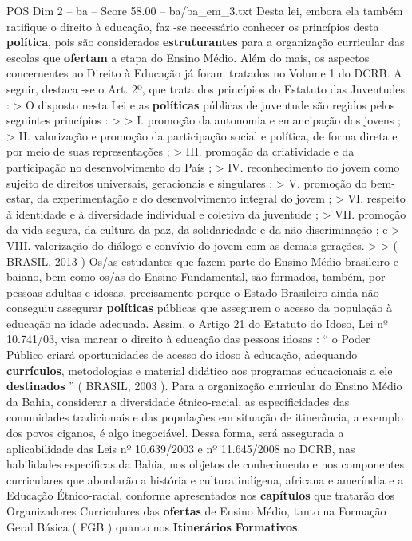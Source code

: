 \begin{textsample}{POS Dim 2 – ba – Score 58.00 – ba/ba\_em\_3.txt}
Desta lei, embora ela também ratifique o direito à educação, faz -se necessário conhecer os princípios desta \textbf{política}, pois são considerados \textbf{estruturantes} para a organização curricular das escolas que \textbf{ofertam} a etapa do Ensino Médio.
Além do mais, os aspectos concernentes ao Direito à Educação já foram tratados no Volume 1 do DCRB.
A seguir, destaca -se o Art. 2º, que trata dos princípios do Estatuto das Juventudes : > O disposto nesta Lei e as \textbf{políticas} públicas de juventude são regidos pelos seguintes princípios : > > I. promoção da autonomia e emancipação dos jovens ; > II. valorização e promoção da participação social e política, de forma direta e por meio de suas representações ; > III. promoção da criatividade e da participação no desenvolvimento do País ; > IV. reconhecimento do jovem como sujeito de direitos universais, geracionais e singulares ; > V. promoção do bem-estar, da experimentação e do desenvolvimento integral do jovem ; > VI. respeito à identidade e à diversidade individual e coletiva da juventude ; > VII. promoção da vida segura, da cultura da paz, da solidariedade e da não discriminação ; e > VIII. valorização do diálogo e convívio do jovem com as demais gerações. > > ( BRASIL, 2013 ) Os/as estudantes que fazem parte do Ensino Médio brasileiro e baiano, bem como os/as do Ensino Fundamental, são formados, também, por pessoas adultas e idosas, precisamente porque o Estado Brasileiro ainda não conseguiu assegurar \textbf{políticas} públicas que assegurem o acesso da população à educação na idade adequada.
Assim, o Artigo 21 do Estatuto do Idoso, Lei nº 10.741/03, visa marcar o direito à educação das pessoas idosas : “ o Poder Público criará oportunidades de acesso do idoso à educação, adequando \textbf{currículos}, metodologias e material didático aos programas educacionais a ele \textbf{destinados} ” ( BRASIL, 2003 ).
Para a organização curricular do Ensino Médio da Bahia, considerar a diversidade étnico-racial, as especificidades das comunidades tradicionais e das populações em situação de itinerância, a exemplo dos povos ciganos, é algo inegociável.
Dessa forma, será assegurada a aplicabilidade das Leis nº 10.639/2003 e nº 11.645/2008 no DCRB, nas habilidades específicas da Bahia, nos objetos de conhecimento e nos componentes curriculares que abordarão a história e cultura indígena, africana e ameríndia e a Educação Étnico-racial, conforme apresentados nos \textbf{capítulos} que tratarão dos Organizadores Curriculares das \textbf{ofertas} de Ensino Médio, tanto na Formação Geral Básica ( FGB ) quanto nos \textbf{Itinerários} \textbf{Formativos}.

\end{textsample}
